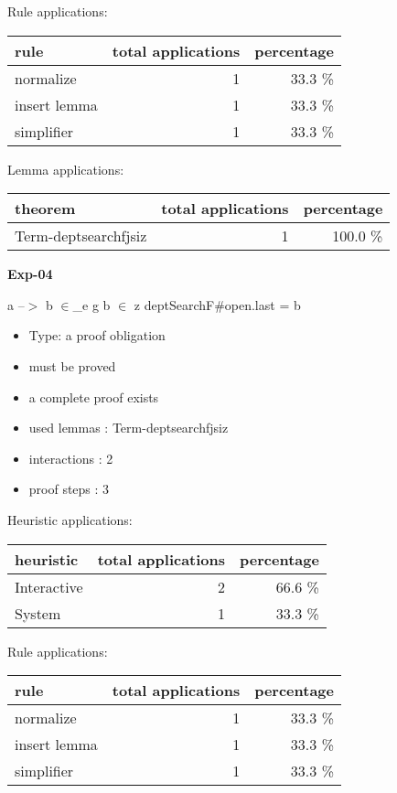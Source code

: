 \documentclass[a4paper]{article}
\begin{document}
Rule applications:

\begin{supertabular}{l|r|r}
rule	        & total applications & percentage \\ \hline
normalize & 1 & 33.3 \% \\
insert lemma & 1 & 33.3 \% \\
simplifier & 1 & 33.3 \% \\

\end{supertabular}

Lemma applications:

\begin{supertabular}{l|r|r}
theorem	        & total applications & percentage \\ \hline
Term-deptsearchfjsiz & 1 & 100.0 \% \\

\end{supertabular}
\pagebreak

{\LARGE\bf Exp-04}\label{lemma-Exp-04}

\medskip

 \Fol a --$>$ b $\in$\_e g \And b $\in$ z \Imp \Do deptSearchF\#\Dc open.last = b

\begin{itemize}

\item Type: a proof obligation

\item       must be proved
\item       a complete proof exists
\item       used lemmas  : Term-deptsearchfjsiz
\item       interactions : 2
\item       proof steps  : 3
\end{itemize}

\medskip


Heuristic applications:

\begin{supertabular}{l|r|r}
heuristic	& total applications & percentage \\ \hline
Interactive & 2 & 66.6 \% \\
System & 1 & 33.3 \% \\

\end{supertabular}

Rule applications:

\begin{supertabular}{l|r|r}
rule	        & total applications & percentage \\ \hline
normalize & 1 & 33.3 \% \\
insert lemma & 1 & 33.3 \% \\
simplifier & 1 & 33.3 \% \\

\end{supertabular}
\end{document}
